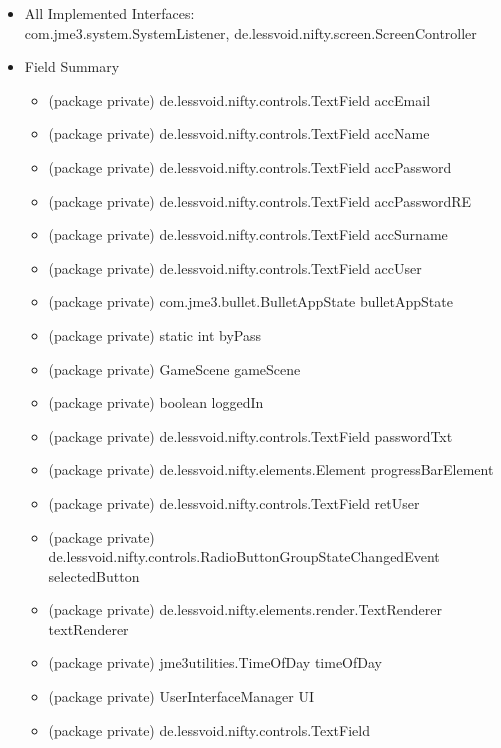 \documentclass[letterpaper]{article}
\begin{document}
								\begin{itemize}
									\item 	All Implemented Interfaces: \\
											com.jme3.system.SystemListener, de.lessvoid.nifty.screen.ScreenController
									\item	Field Summary
											\begin{itemize}
												\item	(package private) de.lessvoid.nifty.controls.TextField	accEmail 
												\item	(package private) de.lessvoid.nifty.controls.TextField	accName 
												\item	(package private) de.lessvoid.nifty.controls.TextField	accPassword 
												\item	(package private) de.lessvoid.nifty.controls.TextField	accPasswordRE 
												\item	(package private) de.lessvoid.nifty.controls.TextField	accSurname 
												\item	(package private) de.lessvoid.nifty.controls.TextField	accUser 
												\item	(package private) com.jme3.bullet.BulletAppState	bulletAppState 
												\item	(package private) static int	byPass 
												\item	(package private) GameScene	gameScene 
												\item	(package private) boolean	loggedIn 
												\item	(package private) de.lessvoid.nifty.controls.TextField	passwordTxt 
												\item	(package private) de.lessvoid.nifty.elements.Element	progressBarElement 
												\item	(package private) de.lessvoid.nifty.controls.TextField	retUser 
												\item	(package private) de.lessvoid.nifty.controls.RadioButtonGroupStateChangedEvent	selectedButton 
												\item	(package private) de.lessvoid.nifty.elements.render.TextRenderer	textRenderer 
												\item	(package private) jme3utilities.TimeOfDay	timeOfDay 
												\item	(package private) UserInterfaceManager	UI 
												\item	(package private) de.lessvoid.nifty.controls.TextField
											\end{itemize} 

\end{itemize}
\end{document}
